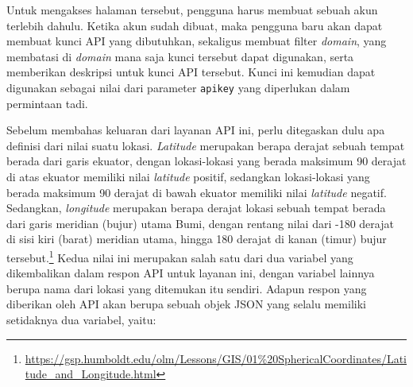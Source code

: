 Untuk mengakses halaman tersebut, pengguna harus membuat sebuah akun terlebih dahulu. Ketika akun sudah dibuat, maka pengguna baru akan dapat membuat kunci API yang dibutuhkan, sekaligus membuat filter \textit{domain}, yang membatasi di \textit{domain} mana saja kunci tersebut dapat digunakan, serta memberikan deskripsi untuk kunci API tersebut. Kunci ini kemudian dapat digunakan sebagai nilai dari parameter \verb|apikey| yang diperlukan dalam permintaan tadi.

Sebelum membahas keluaran dari layanan API ini, perlu ditegaskan dulu apa definisi dari nilai \latlon suatu lokasi. \textit{Latitude} merupakan berapa derajat sebuah tempat berada dari garis ekuator, dengan lokasi-lokasi yang berada maksimum 90 derajat di atas ekuator memiliki nilai \textit{latitude} positif, sedangkan lokasi-lokasi yang berada maksimum 90 derajat di bawah ekuator memiliki nilai \textit{latitude} negatif. Sedangkan, \textit{longitude} merupakan berapa derajat lokasi sebuah tempat berada dari garis meridian (bujur) utama Bumi, dengan rentang nilai dari -180 derajat di sisi kiri (barat) meridian utama, hingga 180 derajat di kanan (timur) bujur tersebut.\footnote{\href{https://gsp.humboldt.edu/olm/Lessons/GIS/01\%20SphericalCoordinates/Latitude\_and\_Longitude.html}{https://gsp.humboldt.edu/olm/Lessons/GIS/01\%20SphericalCoordinates/Latitude\_and\_Longitude.html}} Kedua nilai ini merupakan salah satu dari dua variabel yang dikembalikan dalam respon API untuk layanan ini, dengan variabel lainnya berupa nama dari lokasi yang ditemukan itu sendiri. Adapun respon yang diberikan oleh API akan berupa sebuah objek JSON yang selalu memiliki setidaknya dua variabel, yaitu:

